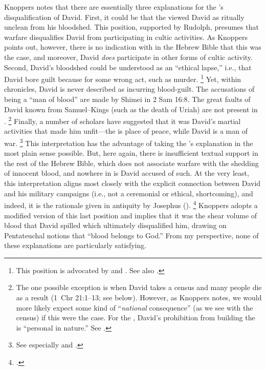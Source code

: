 Knoppers notes that there are essentially three explanations for the \chronicler's disqualification of David. First, it could be that the \chronicler viewed David as ritually unclean from his bloodshed. This position, supported by Rudolph,\autocite[151]{rudolph1955} presumes that warfare disqualifies David from participating in cultic activities. As Knoppers points out, however, there is no indication with in the Hebrew Bible that this was the case, and moreover, David \emph{does} participate in other forms of cultic activity.\autocite[772]{knoppers2007} Second, David's bloodshed could be understood as an ``ethical lapse,'' i.e., that David bore guilt because for some wrong act, such as murder.%
    \footnote{This position is advocated by \cite[53]{dirksen_jsot1996} and \cite{kelly_jsot1998}. See also \cite{braun_jbl1976}.}
Yet, within chronicles, David is never described as incurring blood-guilt. The accusations of being a ``man of blood'' are made by Shimei in 2 Sam 16:8. The great faults of David known from Samuel--Kings (such as the death of Uriah) are not present in \chronicles.%
    \footnote{The one possible exception is when David takes a census and many people die as a result (1~Chr 21:1--13; see below). However, as Knoppers notes, we would more likely expect some kind of ``\emph{national} consequence'' (as we see with the census) if this were the case. For the \chronicler, David's prohibition from building the \temple is ``personal in nature.'' See \cite[772--773]{knoppers2007}.}
Finally, a number of scholars have suggested that it was David's martial activities that made him unfit---the \temple is place of peace, while David is a man of war.%
    \footnote{See especially \cite[396--397]{japhet1993} and \cite{mckenzie_graham-etal1999}.}
This interpretation has the advantage of taking the \chronicler's explanation in the most plain sense possible. But, here again, there is insufficient textual support in the rest of the Hebrew Bible, which does not associate warfare with the shedding of innocent blood, and nowhere in \chronicles is David accused of such. At the very least, this interpretation aligns most closely with the explicit connection between David and his military campaigns (i.e., not a ceremonial or ethical, shortcoming), and indeed, it is the rationale given in antiquity by Josephus ().%
    \footnote{\cite[773]{knoppers2007}.}
Knoppers adopts a modified version of this last position and implies that it was the shear volume of blood that David spilled which ultimately disqualified him, drawing on Pentateuchal notions that ``blood belongs to God.''\autocite[774]{knoppers2007} From my perspective, none of these explanations are particularly satisfying. 

